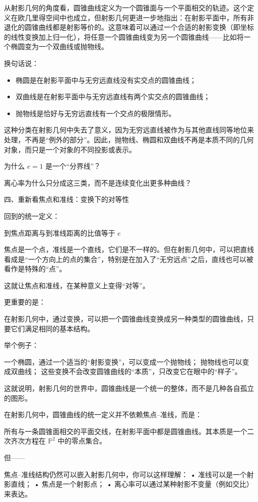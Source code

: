 从射影几何的角度看，圆锥曲线定义为一个圆锥面与一个平面相交的轨迹。这个定义在欧几里得空间中也成立，但射影几何更进一步地指出：在射影平面中，所有非退化的圆锥曲线都是射影等价的。这意味着可以通过一个合适的射影变换（即坐标的线性变换加上归一化），将任意一个圆锥曲线变为另一个圆锥曲线——比如将一个椭圆变为一个双曲线或抛物线。

换句话说：
\begin{itemize}
\item 椭圆是在射影平面中与无穷远直线没有实交点的圆锥曲线；
\item 双曲线是在射影平面中与无穷远直线有两个实交点的圆锥曲线；
\item 抛物线是恰好与无穷远直线有一个交点的极限情形。
\end{itemize}

这种分类在射影几何中失去了意义，因为无穷远直线被作为与其他直线同等地位来处理，不再是“例外的部分”。因此，抛物线、椭圆和双曲线不再是本质不同的几何对象，而只是一个对象的不同投影或表示。


为什么 $e=1$ 是一个“分界线”？

离心率为什么只分成这三类，而不是连续变化出更多种曲线？

四、重新看焦点和准线：变换下的对等性

回到的统一定义：

到焦点距离与到准线距离的比值等于 $e$

焦点是一个点，准线是一个直线，它们是不一样的。但在射影几何中，可以把直线看成是“一个方向上的点的集合”，特别是在加入了“无穷远点”之后，直线也可以被看作是特殊的“点”。

这就让焦点和准线，在某种意义上变得“对等”。

更重要的是：

在射影几何中，通过变换，可以把一个圆锥曲线变换成另一种类型的圆锥曲线，只要它们满足相同的基本结构。

举个例子：


一个椭圆，通过一个适当的“射影变换”，可以变成一个抛物线；
抛物线也可以变成双曲线；
这些变换不会改变圆锥曲线的“本质”，只改变它在眼中的“样子”。

这就说明，射影几何的世界中，圆锥曲线是一个统一的整体，而不是几种各自孤立的图形。


在射影几何中，圆锥曲线的统一定义并不依赖焦点–准线，而是：

所有与一条圆锥面相交的平面交线，在射影平面中都是圆锥曲线。其本质是一个二次齐次方程在 $\mathbb{P}^2$ 中的零点集合。

但——

焦点–准线结构仍然可以嵌入射影几何中，你可以这样理解：
	•	准线可以是一个射影直线；
	•	焦点是一个射影点；
	•	离心率可以通过某种射影不变量（例如交比）来表达。

